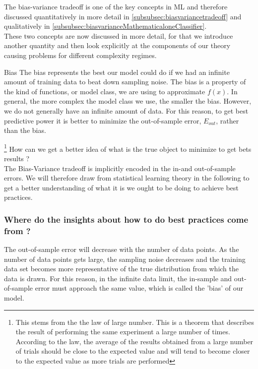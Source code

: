 The bias-variance tradeoff is one of the key concepts in ML and therefore discussed quantitatively in more detail in \ref{subsubsec:biasvariancetradeoff} and qualitatively in \ref{subsubsec:biasvarianceMathematicaloneClassifier}.\\
These two concepts are now discussed in more detail, for that we introduce another quantity and then look explicitly at the components of our theory causing problems for different complexity regimes.
\begin{mybox}{Bias}
	The bias represents the best our model could do if we had an infinite amount of training data to beat down sampling noise. The bias is a property of the kind of functions, or model class, we are using to approximate $f(x)$. In general, the more complex the model class we use, the smaller the bias. However, we do not generally have an infinite amount of data. For this reason, to get best predictive power it is better to minimize the out-of-sample error, $E_{out}$, rather than the bias. 
\end{mybox}\footnote{This stems from the the law of large number. This is a theorem that describes the result of performing the same experiment a large number of times. According to the law, the average of the results obtained from a large number of trials should be close to the expected value and will tend to become closer to the expected value as more trials are performed}
How can we get a better idea of what is the true object to minimize to get bets results ? \\
The Bias-Variance tradeoff is implicitly encoded in the in-and out-of-sample errors. We will therefore draw from statistical learning theory in the following to get a better understanding of what it is we ought to be doing to achieve best practices.\\
\subsubsection{Where do the insights about how to do best practices come from ?}
The out-of-sample error will decrease with the number of data points. As the number of data points gets large, the sampling noise decreases and the training data set becomes more representative of the true distribution from which the data is drawn. For this reason, in the infinite data limit, the in-sample and out-of-sample error must approach the same value, which is called the ’bias’ of our model.

